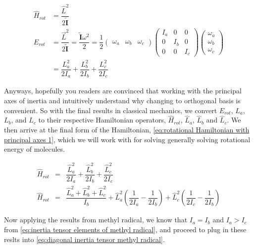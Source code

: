\documentclass[11pt,a4paper]{book}
\begin{document}
			\begin{equation*}
				\label{eq:rotational hamiltonian principal axes of inertia}
				\begin{split}
					\hat{H}_{rot} &= \dfrac{\hat{L}^2}{2\tilde{\textbf{I}}} \\
					E_{rot} &=\dfrac{\vec{L}^2}{2\tilde{\textbf{I}}}  =\dfrac{\tilde{\textbf{I}}\omega^2}{2} =
					\dfrac{1}{2}
					\begin{pmatrix}
						\omega_a & \omega_b & \omega_c
					\end{pmatrix}
					\begin{pmatrix}
							I_{a} & 0 & 0  \\
							0 & I_{b} & 0\\
							0 & 0 & I_{c}
					\end{pmatrix}
					\begin{pmatrix}
						\omega_a\\
						\omega_b\\
						\omega_c
					\end{pmatrix}\\
					&=\dfrac{L_a^2}{2I_a} + \dfrac{L_b^2}{2I_b} + \dfrac{L_c^2}{2I_c}
				\end{split}
			\end{equation*}
			
			Anyways, hopefully you readers are convinced that working with the principal axes of inertia and intuitively understand why changing to orthogonal basis is convenient. So with the final results in classical mechanics, we convert $E_{rot}$, $L_a$, $L_b$, and $L_c$ to their respective Hamiltonian operators, $\hat{H}_{rot}$, $\hat{L}_a$, $\hat{L}_b$ and $\hat{L}_c$. We then arrive at the final form of the Hamiltonian, \autoref{eq:rotational Hamiltonian with principal axes 1}, which we will work with for solving generally solving rotational energy of molecules. 
			
			\begin{eqnarray}
				\label{eq:rotational Hamiltonian with principal axes 1}
				\hat{H}_{rot}  &=& \dfrac{\hat{L}_a^2}{2I_a} + \dfrac{\hat{L}_b^2}{2I_b} + \dfrac{\hat{L}_c^2}{2I_c}\\
				\hat{H}_{rot}&=&\dfrac{\hat{L}_a^2 + \hat{L}_b^2 + \hat{L}_c^2}{I_b} + \hat{L}_a^2\left(\dfrac{1}{2I_a}-\dfrac{1}{2I_b}\right) + \hat{L}_c^2\left(\dfrac{1}{2I_c}-\dfrac{1}{2I_b}\right)
				\label{eq:rotational Hamiltonian with principal axes 2}
			\end{eqnarray}			
			
			Now applying the results from methyl radical, we know that $I_a = I_b$ and $I_a > I_c$ from \autoref{eq:inertia tensor elements of methyl radical}, and proceed to plug in these reslts into \autoref{eq:diagonal inertia tensor methyl radical}.
			
\end{document}
